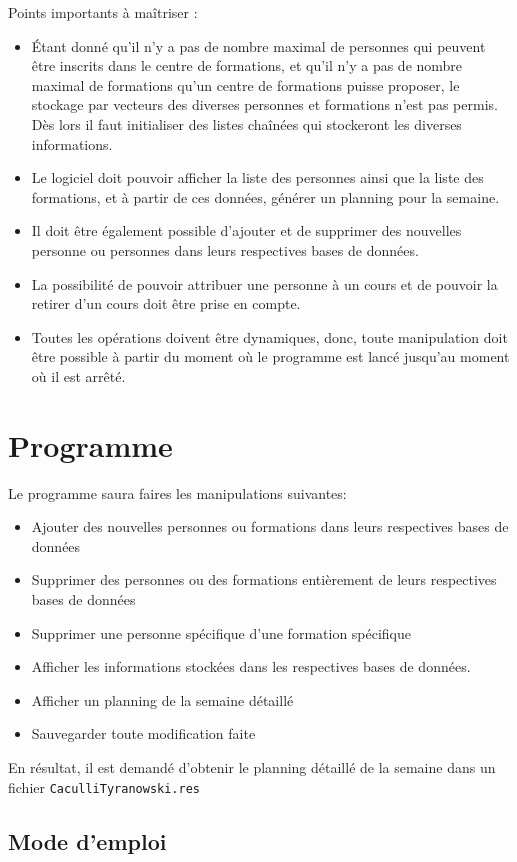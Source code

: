 \documentclass[11pt]{article}
\begin{document}
Points importants à maîtriser :
\begin{itemize}
\item Étant donné qu'il n'y a pas de nombre maximal de personnes qui peuvent être inscrits dans le centre de formations, et qu'il n'y a pas de nombre maximal de formations qu'un centre de formations puisse proposer, le stockage par vecteurs des diverses personnes et formations n'est pas permis. Dès lors il faut initialiser des listes chaînées qui stockeront les diverses informations.
\item Le logiciel doit pouvoir afficher la liste des personnes ainsi que la liste des formations, et à partir de ces données, générer un planning pour la semaine.
\item Il doit être également possible d'ajouter et de supprimer des nouvelles personne ou personnes dans leurs respectives bases de données.
\item La possibilité de pouvoir attribuer une personne à un cours et de pouvoir la retirer d'un cours doit être prise en compte.
\item Toutes les opérations doivent être dynamiques, donc, toute manipulation doit être possible à partir du moment où le programme est lancé jusqu'au moment où il est arrêté.
\end{itemize}

\newpage
\section{Programme}
Le programme saura faires les manipulations suivantes:
\begin{itemize}
\item Ajouter des nouvelles personnes ou formations dans leurs respectives bases de données
\item Supprimer des personnes ou des formations entièrement de leurs respectives bases de données
\item Supprimer une personne spécifique d'une formation spécifique
\item Afficher les informations stockées dans les respectives bases de données.
\item Afficher un planning de la semaine détaillé
\item Sauvegarder toute modification faite
\end{itemize}
En résultat, il est demandé d'obtenir le planning détaillé de la semaine dans un fichier \texttt{CaculliTyranowski.res}
\subsection{Mode d'emploi}
\end{document}
